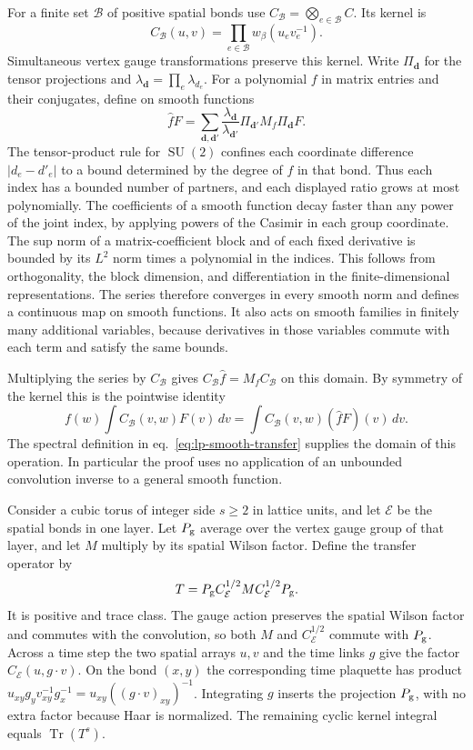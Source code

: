 \documentclass[11pt,letterpaper,reqno]{amsart}
\numberwithin{equation}{section}
\renewcommand{\eqref}[1]{\textup{eq.~\ref{#1}}}
\theoremstyle{definition}
\theoremstyle{remark}
\begin{document}
For a finite set \(\mathcal B\) of positive spatial bonds use
\(C_{\mathcal B}=\bigotimes_{e\in\mathcal B}C\). Its kernel is
\[
 C_{\mathcal B}(u,v)=\prod_{e\in\mathcal B}w_\beta(u_ev_e^{-1}).
\]
Simultaneous vertex gauge transformations preserve this kernel. Write
\(\Pi_{\boldsymbol d}\) for the tensor projections and
\(\lambda_{\boldsymbol d}=\prod_e\lambda_{d_e}\).
For a polynomial \(f\) in matrix entries and their conjugates,
define on smooth functions
\begin{equation}\label{eq:lp-smooth-transfer}
 \widehat f F
 =\sum_{\boldsymbol d,\boldsymbol d'}
   \frac{\lambda_{\boldsymbol d}}{\lambda_{\boldsymbol d'}}
   \Pi_{\boldsymbol d'}M_f\Pi_{\boldsymbol d}F .
\end{equation}
The tensor-product rule for \(\operatorname{SU}(2)\) confines each
coordinate difference \(|d_e-d'_e|\) to a bound determined by
the degree of \(f\) in that bond. Thus each index has a bounded
number of partners, and each displayed ratio grows at most
polynomially. The coefficients of a smooth function decay faster than
any power of the joint index, by applying powers of the Casimir in
each group coordinate. The sup norm of a matrix-coefficient block
and of each fixed derivative is bounded by its \(L^2\) norm times
a polynomial in the indices. This follows from orthogonality, the
block dimension, and differentiation in the finite-dimensional
representations. The series therefore converges in every smooth norm
and defines a continuous map on smooth functions. It also acts on
smooth families in finitely many additional variables, because
derivatives in those variables commute with each term and satisfy
the same bounds.

Multiplying the series by \(C_{\mathcal B}\) gives
\(C_{\mathcal B}\widehat f=M_f C_{\mathcal B}\) on this domain.
By symmetry of the kernel this is the pointwise identity
\begin{equation}\label{eq:lp-kernel-transfer}
 f(w)\int C_{\mathcal B}(v,w)F(v)\,dv
     =\int C_{\mathcal B}(v,w)(\widehat fF)(v)\,dv .
\end{equation}
The spectral definition in \eqref{eq:lp-smooth-transfer} supplies
the domain of this operation. In particular the proof uses no
application of an unbounded convolution inverse to a general
smooth function.

Consider a cubic torus of integer side \(s\ge2\) in lattice units,
and let \(\mathcal E\) be the spatial bonds in one layer. Let \(P_{\rm g}\)
average over the vertex gauge group of that layer, and let \(M\)
multiply by its spatial Wilson factor. Define the transfer operator by
\[
 T=P_{\rm g} C_{\mathcal E}^{1/2}M C_{\mathcal E}^{1/2}P_{\rm g}.
\]
It is positive and trace class. The gauge action preserves the spatial
Wilson factor and commutes with the convolution, so both \(M\) and
\(C_{\mathcal E}^{1/2}\) commute with \(P_{\rm g}\). Across a time step the
two spatial arrays \(u,v\) and the time links \(g\) give the
factor \(C_{\mathcal E}(u,g\cdot v)\). On the bond \((x,y)\)
the corresponding time plaquette has product
\(u_{xy}g_yv_{xy}^{-1}g_x^{-1}=u_{xy}((g\cdot v)_{xy})^{-1}\).
Integrating \(g\) inserts
the projection \(P_{\rm g}\), with no extra factor because Haar is
normalized. The remaining cyclic kernel integral equals
\(\operatorname{Tr}(T^s)\).
\end{document}
